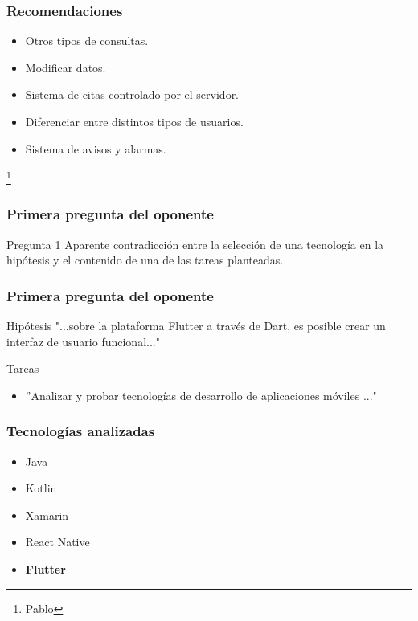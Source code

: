 \documentclass[14pt]{beamer}
\begin{document}
\begin{frame}
\frametitle{Recomendaciones}

\begin{itemize}
\item Otros tipos de consultas.
\item Modificar datos.
\item Sistema de citas controlado por el servidor.
\item Diferenciar entre distintos tipos de usuarios.
\item Sistema de avisos y alarmas.
\end{itemize}

\footnote{Pablo}
\end{frame}





\begin{frame}
\maketitle
\end{frame}




\begin{frame}
\frametitle{Primera pregunta del oponente}
\begin{block}{Pregunta 1}
Aparente contradicción entre la selección de una tecnología en la hipótesis y el contenido de una de las tareas planteadas.
\end{block}
\end{frame}


\begin{frame}
\frametitle{Primera pregunta del oponente}
\begin{block}{Hipótesis}
"...sobre la plataforma Flutter a través de Dart, es posible crear un interfaz de usuario funcional..."
\end{block}

\begin{alertblock}{Tareas}
\begin{itemize}
\item ''Analizar y probar tecnologías de desarrollo de aplicaciones móviles ..."
\end{itemize}

\end{alertblock}
\end{frame}

\begin{frame}
\frametitle{Tecnologías analizadas}
\begin{itemize}
\item Java
\item Kotlin
\item Xamarin
\item React Native
\item \textbf{Flutter}

\end{itemize}

\end{frame}
\end{document}
